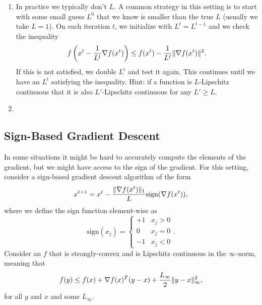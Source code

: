 \documentclass{article}
\begin{document}
\begin{enumerate}
\item In practice we typically don't $L$. A common strategy in this setting is
  to start with some small guess $L^0$ that we know is smaller than the true
  $L$ (usually we take $L=1$). On each iteration $t$, we initialize with
  $L^t = L^{t-1}$ and we check the inequality
  \[
    f\left(x^t - \frac{1}{L^t}\nabla f(x^t)\right) \leq f(x^t) -
    \frac{1}{L^t}\|\nabla f(x^t)\|^2.
  \]
  If this is not satisfied, we double $L^t$ and test it again. This continues
  until we have an $L^t$ satisfying the inequality. \blu{Show that gradient
    descent with $\alpha_t = 1/L^t$ defined in this way has a linear
    convergence rate of
    \[
      f(x^t) - f(x^*) \leq \left(1 - \frac{\mu}{2L}\right)[f(x^0) - f(x^*).
    \]
  } Hint: if a function is $L$-Lipschitz continuous that it is also
  $L'$-Lipschitz continuous for any $L' \geq L$.
\item {}
\end{enumerate}

\subsection{Sign-Based Gradient Descent}

In some situations it might be hard to accurately compute the elements of the gradient, but we might have access to the sign of the gradient. For this setting, consider a sign-based gradient descent algorithm of the form
\[
x^{t+1} = x^t - \frac{\|\nabla f(x^t)\|_1}{L}\text{sign}(\nabla f(x^t)),
\]
where we define the sign function element-wise as
\[
\text{sign}(x_j) = \begin{cases}+1 & x_j > 0\\0 & x_j =0\\-1 & x_j < 0\end{cases}.
\]
Consider an $f$ that is strongly-convex and is Lipschitz continuous in the $\infty$-norm, meaning that
\[
f(y) \leq f(x) + \nabla f(x)^T(y-x) + \frac{L_\infty}{2}\|y-x\|_\infty^2,
\]
for all $y$ and $x$ and some $L_\infty$. 
\end{document}
